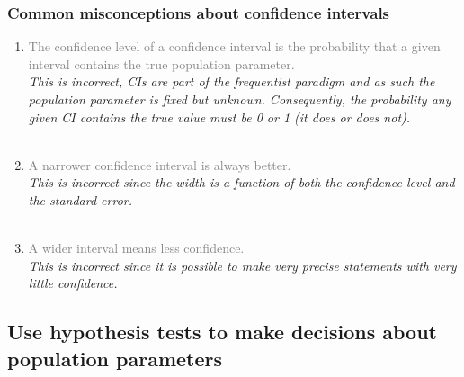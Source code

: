 \documentclass[slidestop,compress,mathserif,12pt,t,professionalfonts,xcolor=table]{beamer}
\begin{document}

\begin{frame}
\frametitle{Common misconceptions about confidence intervals}

\begin{enumerate}

\item \textcolor{gray}{The confidence level of a confidence interval is the probability that a given interval contains the true population parameter.} \\
\textit{This is incorrect, CIs are part of the frequentist paradigm and as such the population parameter is fixed but unknown. Consequently, the probability any given CI contains the true value must be 0 or 1 (it does or does not).} \\
$\:$ \\

\pause

\item  \textcolor{gray}{A narrower confidence interval is always better.}\\
\textit{This is incorrect since the width is a function of both the confidence level and the standard error.} \\
$\:$ \\

\pause

\item   \textcolor{gray}{A wider interval means less confidence.} \\
\textit{This is incorrect since it is possible to make very precise statements with very little confidence.} \\

\end{enumerate}

\end{frame}


\subsection{Use hypothesis tests to make decisions about population parameters}
\label{mi4}


\begin{frame}

\vfill


\vfill

\end{frame}
\end{document}
